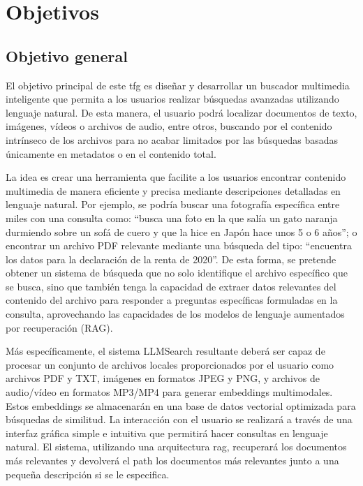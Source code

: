
\chapter{Objetivos}
\label{objetivos}

\section{Objetivo general}
El objetivo principal de este \gls{tfg} es diseñar y desarrollar un buscador multimedia inteligente que permita a los usuarios realizar búsquedas avanzadas utilizando lenguaje natural. De esta manera, el usuario podrá localizar documentos de texto, imágenes, vídeos o archivos de audio, entre otros, buscando por el contenido intrínseco de los archivos para no acabar limitados por las búsquedas basadas únicamente en metadatos o en el contenido total.

La idea es crear una herramienta que facilite a los usuarios encontrar contenido multimedia de manera eficiente y precisa mediante descripciones detalladas en lenguaje natural. Por ejemplo, se podría buscar una fotografía específica entre miles con una consulta como: “busca una foto en la que salía un gato naranja durmiendo sobre un sofá de cuero y que la hice en Japón hace unos 5 o 6 años”; o encontrar un archivo PDF relevante mediante una búsqueda del tipo: “encuentra los datos para la declaración de la renta de 2020”.
De esta forma, se pretende obtener un sistema de búsqueda que no solo identifique el archivo específico que se busca, sino que también tenga la capacidad de extraer datos relevantes del contenido del archivo para responder a preguntas específicas formuladas en la consulta, aprovechando las capacidades de los modelos de lenguaje aumentados por recuperación (RAG).

Más específicamente, el sistema LLMSearch resultante deberá ser capaz de procesar un conjunto de archivos locales proporcionados por el usuario como archivos PDF y TXT, imágenes en formatos JPEG y PNG, y archivos de audio/vídeo en formatos MP3/MP4 para generar embeddings multimodales. Estos embeddings se almacenarán en una base de datos vectorial optimizada para búsquedas de similitud. La interacción con el usuario se realizará a través de una interfaz gráfica simple e intuitiva que permitirá hacer consultas en lenguaje natural. El sistema, utilizando una arquitectura \gls{rag}, recuperará los documentos más relevantes y devolverá el path los documentos más relevantes junto a una pequeña descripción si se le especifica.

